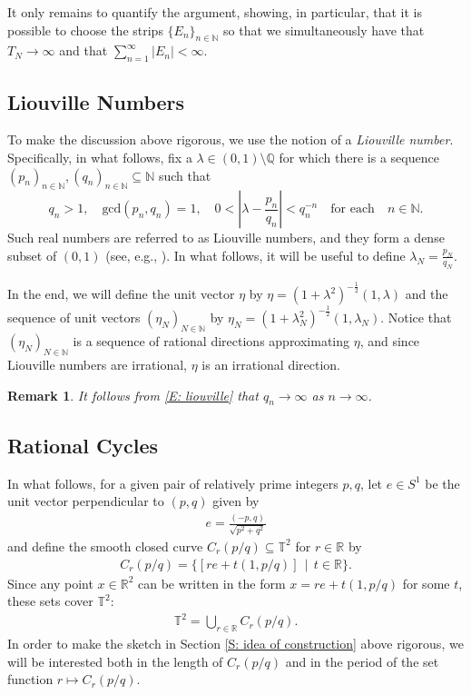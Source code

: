 \documentclass[12pt]{amsart}
\newtheorem{remark}{Remark}
\begin{document}
It only remains to quantify the argument, showing, in particular, that it is possible to choose the strips $\{E_{n}\}_{n \in \mathbb{N}}$ so that we simultaneously have that $T_{N} \to \infty$ and that $\sum_{n = 1}^{\infty} |E_{n}| < \infty$. 

\subsection{Liouville Numbers} To make the discussion above rigorous, we use the notion of a \emph{Liouville number}. Specifically, in what follows, fix a $\lambda \in (0,1) \setminus \mathbb{Q} $ for which there is a sequence $(p_{n})_{n \in \mathbb{N}}, (q_{n})_{n \in \mathbb{N}} \subseteq \mathbb{N}$ such that
	\begin{equation} \label{E: liouville}
		q_{n} > 1, \quad \text{gcd}(p_{n},q_{n}) = 1, \quad 0 < \left| \lambda - \frac{p_{n}}{q_{n}} \right| < q_{n}^{-n} \quad \text{for each} \quad n \in \mathbb{N}.
	\end{equation}
Such real numbers are referred to as Liouville numbers, and they form a dense subset of $(0,1)$ (see, e.g., \cite[Chapter 2]{oxtoby}).  In what follows, it will be useful to define $\lambda_{N} = \frac{p_{N}}{q_{N}}$.

In the end, we will define the unit vector $\eta$ by $\eta = (1 + \lambda^{2})^{-\frac{1}{2}} (1,\lambda)$ and the sequence of unit vectors $(\eta_{N})_{N \in \mathbb{N}}$ by $\eta_{N} = (1 + \lambda_{N}^{2})^{-\frac{1}{2}} (1,\lambda_{N})$. Notice that $(\eta_{N})_{N \in \mathbb{N}}$ is a sequence of rational directions approximating $\eta$, and since Liouville numbers are irrational, $\eta$ is an irrational direction. 
	
\begin{remark} \label{rmk:liouville-q-divergence} It follows from \eqref{E: liouville} that $q_{n} \to \infty$ as $n \to \infty$. \end{remark}
	
\subsection{Rational Cycles} In what follows, for a given pair of relatively prime integers $p,q$, let $e \in S^{1}$ be the unit vector perpendicular to $(p,q)$ given by 
	\begin{align*}
		e = \frac{ ( - p, q ) }{ \sqrt{ p^{2} + q^{2} } }
	\end{align*}
and define the smooth closed curve $C_{r}(p/q) \subseteq \mathbb{T}^{2}$ for $r \in \mathbb{R}$ by
	\begin{align*}
		C_{r}(p/q) = \{ [ r e + t(1,p/q) ] \, \mid \, t \in \mathbb{R} \}.
	\end{align*}
Since any point $x \in \mathbb{R}^{2}$ can be written in the form $x = r e + t(1,p/q)$ for some $t$, these sets cover $\mathbb{T}^{2}$:
	\begin{align*}
		\mathbb{T}^{2} = \bigcup_{r \in \mathbb{R}} C_{r}(p/q).
	\end{align*}
In order to make the sketch in Section \ref{S: idea of construction} above rigorous, we will be interested both in the length of $C_{r}(p/q)$ and in the period of the set function $r \mapsto C_{r}(p/q)$.  
\end{document}
